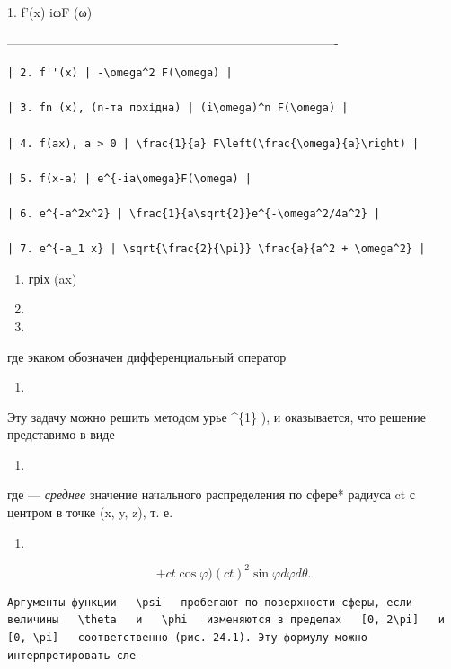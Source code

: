\documentclass[
  ukrainian,
]{article}
\providecommand{\tightlist}{%
  \setlength{\itemsep}{0pt}\setlength{\parskip}{0pt}}
\begin{document}
1. f'(x) \textbar{} iωF (ω) \textbar{}

\textbar------------------------------\textbar-------------------------------------------------\textbar{}

\begin{verbatim}
| 2. f''(x) | -\omega^2 F(\omega) |

| 3. fn (x), (n-та похідна) | (i\omega)^n F(\omega) |

| 4. f(ax), a > 0 | \frac{1}{a} F\left(\frac{\omega}{a}\right) |

| 5. f(x-a) | e^{-ia\omega}F(\omega) |

| 6. e^{-a^2x^2} | \frac{1}{a\sqrt{2}}e^{-\omega^2/4a^2} |

| 7. e^{-a_1 x} | \sqrt{\frac{2}{\pi}} \frac{a}{a^2 + \omega^2} |
\end{verbatim}

\begin{enumerate}
\def\labelenumi{\arabic{enumi}.}
\setcounter{enumi}{19}
\item
  гріх (ax)
\item
\item
\end{enumerate}

где экаком \Delta   обозначен дифференциальный оператор

\begin{enumerate}
\def\labelenumi{\arabic{enumi}.}
\setcounter{enumi}{9}
\tightlist
\item
\end{enumerate}

Эту задачу можно решить методом \Phi  урье \^{}\{1\} ), и оказывается,
что решение представимо в виде

\begin{enumerate}
\def\labelenumi{\arabic{enumi}.}
\setcounter{enumi}{10}
\tightlist
\item
\end{enumerate}

где \overline{\psi} --- \emph{среднее} значение начального распределения
\psi   *по сфере* радиуса ct с центром в точке (x, y, z), т. е.

\begin{enumerate}
\def\labelenumi{\arabic{enumi}.}
\setcounter{enumi}{11}
\tightlist
\item
\end{enumerate}

\[
+ ct \cos \varphi  )   (ct)^2 \sin \varphi d\varphi d\theta  .
\]

\begin{verbatim}
Аргументы функции   \psi   пробегают по поверхности сферы, если величины   \theta   и   \phi   изменяются в пределах   [0, 2\pi]   и   [0, \pi]   соответственно (рис. 24.1). Эту формулу можно интерпретировать сле-
\end{verbatim}
\end{document}
